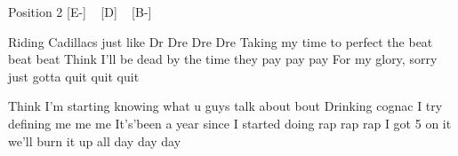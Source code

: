 
Position 2
[E-] ~ [D] ~ [B-] ~

Riding Cadillacs just like Dr Dre Dre Dre
Taking my time to perfect the beat beat beat
Think I'll be dead by the time they pay pay pay
For my glory, sorry just gotta quit quit quit


Think I'm starting knowing what u guys talk about bout
Drinking cognac I try defining me me me
It's'been a year since I started doing rap rap rap
I got 5 on it we'll burn it up all day day day

